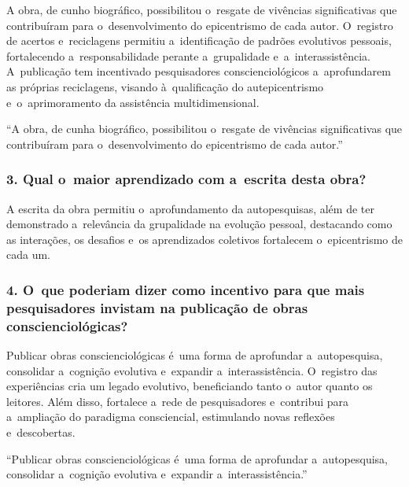 \documentclass{gescons}
\begin{document}
\begin{multicols}{2}
A obra, de cunho biográfico, possibilitou o~resgate de vivências significativas que contribuíram para o~desenvolvimento do epicentrismo de cada autor. O~registro de acertos e~reciclagens permitiu a~identificação de padrões evolutivos pessoais, fortalecendo a~responsabilidade perante a~grupalidade e~a~interassistência. A~publicação tem incentivado pesquisadores conscienciológicos a~aprofundarem as próprias reciclagens, visando à~qualificação do autepicentrismo e~o~aprimoramento da assistência multidimensional.  

\begin{pullquote}
``A obra, de cunha biográfico, possibilitou o~resgate de vivências significativas que contribuíram para o~desenvolvimento do epicentrismo de cada autor.''
\end{pullquote}


\subsubsection{3. Qual o~maior aprendizado com a~escrita desta obra?}

A escrita da obra permitiu o~aprofundamento da autopesquisas, além de ter demonstrado a~relevância da grupalidade na evolução pessoal, destacando como as interações, os desafios e~os aprendizados coletivos fortalecem o~epicentrismo de cada um. 


\subsubsection{4. O~que poderiam dizer como incentivo para que mais pesquisadores invistam na publicação de obras conscienciológicas?}

Publicar obras conscienciológicas é~uma forma de aprofundar a~autopesquisa, consolidar a~cognição evolutiva e~expandir a~interassistência. O~registro das experiências cria um legado evolutivo, beneficiando tanto o~autor quanto os leitores. Além disso, fortalece a~rede de pesquisadores e~contribui para a~ampliação do paradigma consciencial, estimulando novas reflexões e~descobertas.


\begin{pullquote}
``Publicar obras conscienciológicas é~uma forma de aprofundar a~autopesquisa, consolidar a~cognição evolutiva e~expandir a~interassistência.''
\end{pullquote}




    \end{multicols}
\end{document}
